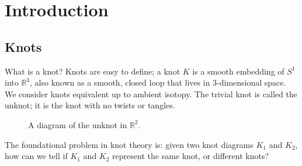 \documentclass[reqno, 12pt]{amsart}
\title{\resizebox{\textwidth}{!}{\textbf{COMPUTING THE KNOT FLOER HOMOLOGY OF $(1,1)$-KNOTS}}}
\author{CLAYTON JORDAN}
\date{}
\theoremstyle{remark}
\begin{document}
\maketitle

\section{Introduction}
\subsection{Knots}
What is a knot? Knots are easy to define; a knot $K$ is a smooth embedding of $S^1$ into $\mathbb{R}^3$, also known as a smooth, closed loop that lives in $3$-dimensional space. We consider knots equivalent up to ambient isotopy. The trivial knot is called  the unknot; it is the knot with no twists or tangles.
\begin{figure}[H]
	\centering
	\caption{A diagram of the unknot in $\mathbb{R}^2$.}
\end{figure}
The foundational problem in knot theory is: given two knot diagrams $K_1$ and $K_2$, how can we tell if $K_1$ and $K_2$ represent the same knot, or different knots?
\end{document}
